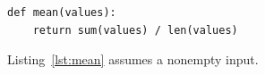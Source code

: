 \documentclass{article}
\begin{document}
\begin{lstlisting}[caption={A transparent calculation},label={lst:mean}]
def mean(values):
    return sum(values) / len(values)
\end{lstlisting}
Listing~\ref{lst:mean} assumes a nonempty input.
\end{document}
